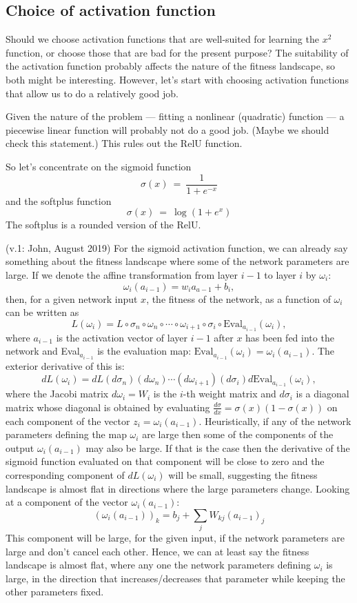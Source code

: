 \documentclass[12pt,a4paper]{article}
\begin{document}
\subsection{Choice of activation function}

Should we choose activation functions that are well-suited for learning  the $x^2$ function, or
choose those that are bad for the present purpose?  The suitability of the activation function
probably affects the nature of the fitness landscape, so both might be interesting.  However, let's
start with choosing activation functions that allow us to do a relatively good job.  

Given the nature of the problem --- fitting a nonlinear (quadratic) function --- a piecewise linear
function will probably not do a good job.  (Maybe we should check this statement.)  This rules out
the RelU function.

So let's concentrate on the sigmoid function
\[
\sigma(x) ~=~ \frac{1}{1+e^{-x}}
\]
and the softplus function
\[
\sigma(x) ~=~ \log(1 + e^x)
\]
The softplus is a rounded version of the RelU.  

(v.1: John, August 2019)
For the sigmoid activation function, we can already say something about the fitness landscape where some of the network parameters are large. If we denote the affine transformation from layer $i-1$ to layer $i$ by $\omega_i$:
\[
\omega_i(a_{i-1}) = w_ia_{a-1} + b_i,
\]
then, for a given network input $x$, the fitness of the network, as a function of $\omega_i$ can be written as
\[
L(\omega_i) = L\circ\sigma_n\circ\omega_n\circ\cdots
				\circ\omega_{i+1}\circ\sigma_i\circ
				\mbox{Eval}_{a_{i-1}}(\omega_i),
\]
where $a_{i-1}$ is the activation vector of layer $i-1$ after $x$ has been fed into the network and Eval$_{a_{i-1}}$ is the evaluation map: $\mbox{Eval}_{a_{i-1}}(\omega_i) = \omega_i(a_{i-1})$. The exterior derivative of this is:
\[
dL(\omega_i) = dL (d\sigma_n) (d\omega_n) \cdots
				(d\omega_{i+1}) (d\sigma_i)
				d\mbox{Eval}_{a_{i-1}}(\omega_i),
\]
where the Jacobi matrix $d\omega_i = W_i$ is the $i$-th weight matrix and $d\sigma_i$ is a diagonal matrix whose diagonal is obtained by evaluating $\frac{d\sigma}{dx}=\sigma(x)(1-\sigma(x))$ on each component of the vector $z_i = \omega_i(a_{i-1})$. Heuristically, if any of the network parameters defining the map $\omega_i$ are large then some of the components of the output $\omega_i(a_{i-1})$ may also be large. If that is the case then the derivative of the sigmoid function evaluated on that component will be close to zero and the corresponding component of $dL(\omega_i)$ will be small, suggesting the fitness landscape is almost flat in directions where the large parameters change. Looking at a component of the vector $\omega_i(a_{i-1})$:
\[
\left(\omega_i(a_{i-1})\right)_k = b_j + \sum_j W_{kj}(a_{i-1})_j
\]
This component will be large, for the given input, if the network parameters are large and don't cancel each other. Hence, we can at least say the fitness landscape is almost flat, where any one the network parameters defining $\omega_i$ is large, in the direction that increases/decreases that parameter while keeping the other parameters fixed. 
\end{document}
